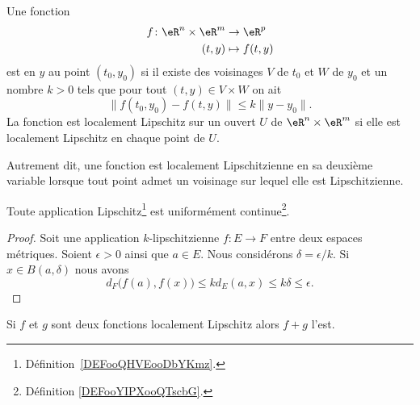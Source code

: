 \begin{definition}      \label{DefJSFFooEOCogV}
	Une fonction
	\begin{equation}
		\begin{aligned}
			f\colon \eR^n\times \eR^m & \to \eR^p      \\
			(t,y)                     & \mapsto f(t,y)
		\end{aligned}
	\end{equation}
	est  en \( y\) au point \( (t_0,y_0)\) si il existe des voisinages \( V\) de \( t_0\) et \( W\) de \( y_0\) et un nombre \( k>0\) tels que pour tout \( (t,y)\in V\times W\) on ait
	\begin{equation}
		\big\| f(t_0,y_0)-f(t,y) \big\|\leq k\| y-y_0 \|.
	\end{equation}
	La fonction est localement Lipschitz sur un ouvert \( U\) de \( \eR^n\times \eR^m\) si elle est localement Lipschitz en chaque point de \( U\).
\end{definition}

\begin{normaltext}      \label{NORMooYNRAooBgobcK}
	Autrement dit, une fonction est localement Lipschitzienne en sa deuxième variable lorsque tout point admet un voisinage sur lequel elle est Lipschitzienne.
\end{normaltext}

\begin{proposition} \label{PROPooVZSAooUneOQK}
	Toute application Lipschitz\footnote{Définition~\ref{DEFooQHVEooDbYKmz}.} est uniformément continue\footnote{Définition \ref{DEFooYIPXooQTscbG}.}.
\end{proposition}

\begin{proof}
	Soit une application \( k\)-lipschitzienne \( f\colon E\to F\) entre deux espaces métriques. Soient \( \epsilon>0\) ainsi que \( a\in E\). Nous considérons \( \delta=\epsilon/k\). Si \( x\in B(a,\delta)\) nous avons
	\begin{equation}
		d_F\big( f(a),f(x) \big)\leq kd_E(a,x)\leq k\delta\leq \epsilon.
	\end{equation}
\end{proof}

\begin{proposition}     \label{PropGIBZooVsIqfY}
	Si \( f\) et \( g\) sont deux fonctions localement Lipschitz alors \( f+g\) l'est.
\end{proposition}

